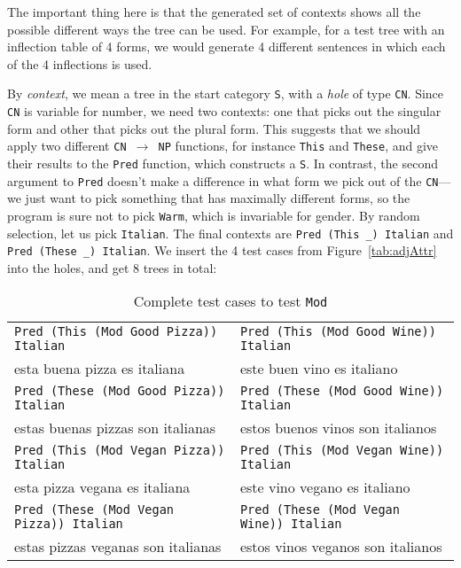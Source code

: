 \documentclass[11pt]{article}
\def\t#1{\texttt{#1}}
\begin{document}
The important thing here is that the generated set of contexts shows
all the possible different ways the tree can be used. For example, for
a test tree with an inflection table of 4 forms, we would generate 4 different sentences in which each of the 4 inflections is used.

By \emph{context}, we mean a tree in the start category \t{S}, with a 
\emph{hole} of type \t{CN}. 
Since \t{CN} is variable for number, we need two contexts: 
one that picks out the singular form and other that picks out
the plural form. 
This suggests that we should apply two different
\t{CN $\rightarrow$ NP} functions, for instance \t{This} and \t{These}, and
give their results to the \t{Pred} function, which constructs a \t{S}.
In contrast, the second argument to \t{Pred} doesn't make a difference
in what form we pick out of the \t{CN}---we just want to pick
something that has maximally different forms, so the program is sure
not to pick \t{Warm}, which is invariable for gender. By random
selection, let us pick \t{Italian}.
The final contexts are \verb|Pred (This _) Italian| and \verb|Pred (These _) Italian|.
We insert the 4 test cases from Figure~\ref{tab:adjAttr} into the
holes, and get 8 trees in total: 

\begin{table}
\centering
\begin{tabular}{| l | l |}
\hline
\t{Pred (This (Mod Good Pizza)) Italian} & \t{Pred (This (Mod Good Wine))
                                        Italian} \\ 
esta buena pizza es italiana          & este buen vino es italiano \\ \hline
\t{Pred (These (Mod Good Pizza)) Italian} & \t{Pred (These (Mod Good Wine))
                                        Italian} \\ 
estas buenas pizzas son italianas          & estos buenos vinos son italianos \\ \hline
\t{Pred (This (Mod Vegan Pizza)) Italian} & \t{Pred (This (Mod Vegan Wine))
                                        Italian} \\ 
esta pizza vegana es italiana          & este vino vegano es italiano \\ \hline
\t{Pred (These (Mod Vegan Pizza)) Italian} & \t{Pred (These (Mod Vegan Wine))
                                        Italian} \\ 
estas pizzas veganas son italianas          & estos vinos veganos son italianos \\ \hline
\end{tabular}
\caption{Complete test cases to test \t{Mod}}
\label{tab:testCases}
\end{table}
\end{document}
